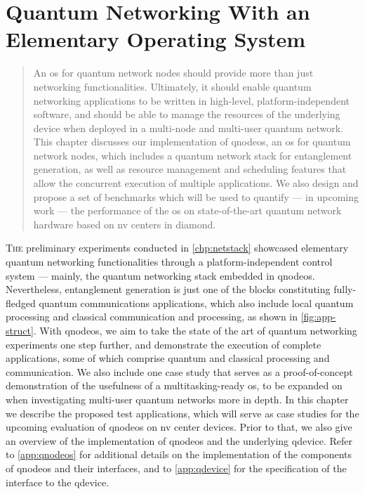 \chapter{Quantum Networking With an Elementary Operating System}
\label{chp:qnodeos}

\begin{abstract}
An \acrfull{os} for quantum network nodes should provide more than just networking functionalities.
Ultimately, it should enable quantum networking applications to be written in high-level,
platform-independent software, and should be able to manage the resources of the underlying
device when deployed in a multi-node and multi-user quantum network. This chapter discusses our
implementation of \acrshort{qnodeos}, an \acrshort{os} for quantum network nodes, which includes a
quantum network stack for entanglement generation, as well as resource management and scheduling
features that allow the concurrent execution of multiple applications. We also design and propose a
set of benchmarks which will be used to quantify --- in upcoming work --- the performance of the
\acrshort{os} on state-of-the-art quantum network hardware based on \acrlong{nv} centers in diamond.
\end{abstract}


\newpage

\lettrine{T}{he} preliminary experiments conducted in \cref{chp:netstack} showcased elementary
quantum networking functionalities through a platform-independent control system --- mainly, the
quantum networking stack embedded in \acrshort{qnodeos}. Nevertheless, entanglement generation is
just one of the blocks constituting fully-fledged quantum communications applications, which also
include local quantum processing and classical communication and processing, as shown in
\cref{fig:app-struct}. With \acrshort{qnodeos}, we aim to take the state of the art of quantum
networking experiments one step further, and demonstrate the execution of complete applications,
some of which comprise quantum and classical processing and communication. We also include one case
study that serves as a proof-of-concept demonstration of the usefulness of a multitasking-ready
\acrshort{os}, to be expanded on when investigating multi-user quantum networks more in depth. In
this chapter we describe the proposed test applications, which will serve as case studies for the
upcoming evaluation of \acrshort{qnodeos} on \acrshort{nv} center devices. Prior to that, we also
give an overview of the implementation of \acrshort{qnodeos} and the underlying \acrshort{qdevice}.
Refer to \cref{app:qnodeos} for additional details on the implementation of the components of
\acrshort{qnodeos} and their interfaces, and to \cref{app:qdevice} for the specification of the
interface to the \acrshort{qdevice}.

